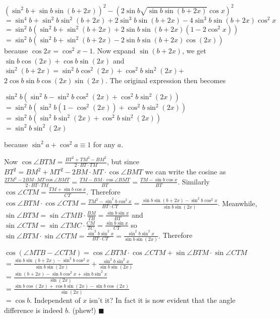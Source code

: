 \documentclass[11pt,a4paper]{article}
\begin{document}
\begin{enumerate}
$(\sin ^{2} b+\sin b\sin (b+2x))^{2}-(2\sin b\sqrt{\sin b\sin (b+2x)}\cos x)^{2}$\\$=\sin ^{4} b+\sin ^{2}b\sin ^{2}(b+2x)+2\sin ^{3} b\sin (b+2x)-4\sin^{3} b\sin (b+2x)\cos ^{2}x$\\$=\sin ^{2} b (\sin ^{2} b+\sin ^{2}(b+2x)+2\sin b\sin (b+2x)(1-2\cos ^{2}x))$\\$=\sin ^{2} b (\sin ^{2} b+\sin ^{2}(b+2x)-2\sin b\sin (b+2x)\cos (2x))$\\ because $\cos 2x=\cos^{2} x-1$. Now expand $\sin (b+2x)$, we get $\sin b\cos (2x)+\cos b\sin (2x)$ and $\sin ^{2}(b+2x)=\sin ^{2}b\cos ^{2}(2x)+\cos ^{2}b\sin ^{2}(2x)$+$2\cos b\sin b\cos (2x)\sin (2x)$. The original expression then becomes 

$\sin^2 {b}(\sin ^{2} b-\sin ^{2}b\cos ^{2}(2x)+\cos^{2}b\sin^{2} (2x))$\\$=\sin^2 {b}(\sin ^{2} b(1-\cos ^{2}(2x))+\cos^{2}b\sin^{2} (2x))$\\$=\sin^2 {b}(\sin ^{2} b\sin ^{2}(2x)+\cos^{2}b\sin^{2} (2x))$\\$=\sin ^{2}b\sin ^{2} (2x)$ 

because $\sin ^{2}a+\cos ^{2}a\equiv 1$ for any $a$.

Now $\cos\angle BTM=\frac{BT^{2}+TM^{2}-BM^{2}}{2\cdot BT\cdot TM}$, but since $BT^{2}=BM^{2}+MT^{2}-2BM\cdot MT\cdot\cos\angle BMT$ we can write the cosine as $\frac{2TM^{2}-2BM\cdot MT\cos\angle BMT}{2\cdot BT\cdot TM}=\frac{TM-BM\cdot\cos\angle BMT}{BT}=\frac{TM-\sin b\cos x}{BT}.$ Similarly $\cos\angle CTM=\frac{TM+\sin b\cos x}{CT}$. Therefore $\cos\angle BTM\cdot \cos\angle CTM=\frac{TM^{2}-\sin ^{2}b\cos ^{2}x}{BT\cdot CT}=\frac{\sin b\sin (b+2x)-\sin ^{2}b\cos ^{2}x}{\sin b\sin (2x)}.$ Meanwhile, $\sin\angle BTM=\sin\angle TMB\cdot\frac{BM}{TB}=\frac{\sin b\sin x}{BT}$ and $\sin\angle CTM=\sin\angle TMC\cdot\frac{CM}{TC}=\frac{\sin b\sin x}{CT}$ so $\sin\angle BTM\cdot\sin\angle CTM=\frac{\sin ^{2}b\sin ^{2}x}{BT\cdot CT}=\frac{\sin ^{2}b\sin ^{2}x}{\sin b\sin (2x)}.$ Therefore 

$\cos (\angle MTB-\angle CTM)=\cos\angle BTM\cdot \cos\angle CTM+\sin\angle BTM\cdot\sin\angle CTM$\\$=\frac{\sin b\sin (b+2x)-\sin ^{2}b\cos ^{2}x}{\sin b\sin (2x)}+\frac{\sin ^{2}b\sin ^{2}x}{\sin b\sin (2x)}$\\$=\frac{\sin (b+2x)-\sin b\cos ^{2}x+\sin b\sin ^{2}x}{\sin (2x)}$\\$=\frac{\sin b\cos (2x)+\cos b\sin (2x)-\sin b\cos (2x)}{\sin (2x)}$\\$=\cos b.$ Independent of $x$ isn't it? In fact it is now evident that the angle difference is indeed $b$. (phew!) $\blacksquare$

\end{enumerate}
\end{document}
